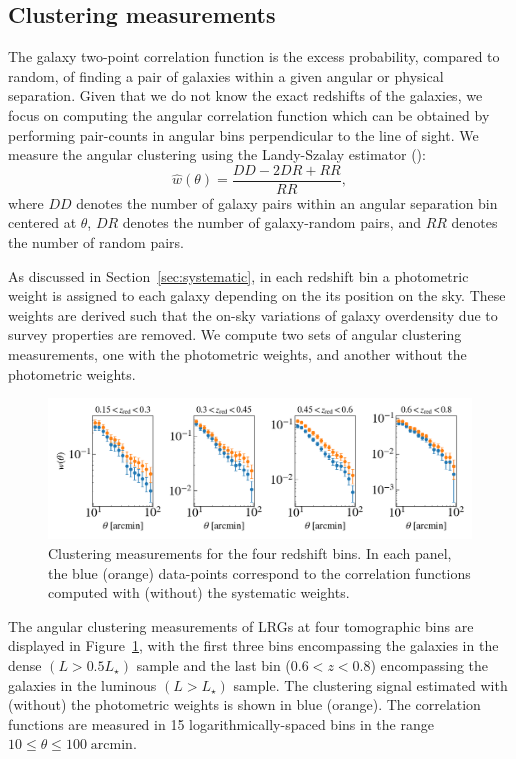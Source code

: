\documentclass{aa}
\numberwithin{equation}{section}
\begin{document}
\subsection{Clustering measurements}\label{sec:measurement}

The galaxy two-point correlation function is the excess probability, compared to random, of finding a pair of galaxies within a given angular or physical separation. Given that we do not know the exact redshifts of the galaxies, we focus on computing the angular correlation function which can be obtained by performing pair-counts in angular bins perpendicular to the line of sight. We measure the angular clustering using the Landy-Szalay estimator (\citealt{landy}):
\begin{equation}
    \widehat{w}(\theta) = \frac{DD-2DR+RR}{RR},
\label{eq:landy}
\end{equation}
where $DD$ denotes the number of galaxy pairs within an angular separation bin centered at $\theta$, $DR$ denotes the number of galaxy-random pairs, and $RR$ denotes the number of random pairs. 

As discussed in Section~\ref{sec:systematic}, in each redshift bin a photometric weight is assigned to each galaxy depending on the its position on the sky. These weights are derived such that the on-sky variations of galaxy overdensity due to survey properties are removed. We compute two sets of angular clustering measurements, one with the photometric weights, and another without the photometric weights. 

\begin{figure}
\includegraphics[width=\textwidth]{figures_tmp/woftheta.png}
\caption{Clustering measurements for the four redshift bins. In each panel, the blue (orange) data-points correspond to the correlation functions computed with (without) the systematic weights.} 
\label{fig:xi} 
\end{figure}

The angular clustering measurements of LRGs at four tomographic bins are displayed in Figure~\ref{fig:xi}, with the first three bins encompassing the galaxies in the dense $(L> 0.5L_{\star})$ sample and the last bin ($0.6<z<0.8$) encompassing the galaxies in the luminous $(L> L_{\star})$ sample. The clustering signal estimated with (without) the photometric weights is shown in blue (orange). The correlation functions are measured in 15 logarithmically-spaced bins in the range $ 10\leq \theta \leq 100 \; \mathrm{arcmin}$. 
\end{document}

